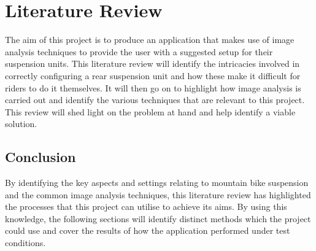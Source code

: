 \section{Literature Review}\label{sec:lit_review}
	The aim of this project is to produce an application that makes use of image analysis techniques to provide the user with a suggested setup for their suspension units. This literature review will identify the intricacies involved in correctly configuring a rear suspension unit and how these make it difficult for riders to do it themselves. It will then go on to highlight how image analysis is carried out and identify the various techniques that are relevant to this project. This review will shed light on the problem at hand and help identify a viable solution.
	
	
	
	
	
	\subsection{Conclusion}
		By identifying the key aspects and settings relating to mountain bike suspension and the common image analysis techniques, this literature review has highlighted the processes that this project can utilise to achieve its aims. By using this knowledge, the following sections will identify distinct methods which the project could use and cover the results of how the application performed under test conditions.